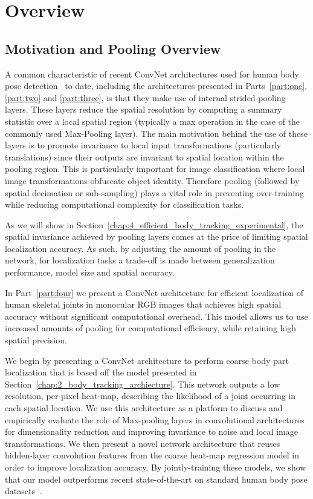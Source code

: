 \chapter{Overview\label{chap:4_efficient_body_tracking_overview}}

\section{Motivation and Pooling Overview}

A common characteristic of recent ConvNet architectures used for human body pose detection~\cite{tompsonnips2014, arjunaccv2014, deeppose, chennips2014} to date, including the architectures presented in Parts~\ref{part:one}, \ref{part:two} and \ref{part:three}, is that they make use of internal strided-pooling layers. These layers reduce the spatial resolution by computing a summary statistic over a local spatial region (typically a max operation in the case of the commonly used Max-Pooling layer). The main motivation behind the use of these layers is to promote invariance to local input transformations (particularly translations) since their outputs are invariant to spatial location within the pooling region. This is particularly important for image classification where local image transformations obfuscate object identity. Therefore pooling (followed by spatial decimation or sub-sampling) plays a vital role in preventing over-training while reducing computational complexity for classification tasks.

As we will show in Section~\ref{chap:4_efficient_body_tracking_experimental}, the spatial invariance achieved by pooling layers comes at the price of limiting spatial localization accuracy. As such, by adjusting the amount of pooling in the network, for localization tasks a trade-off is made between generalization performance, model size and spatial accuracy.

In Part~\ref{part:four} we present a ConvNet architecture for efficient localization of human skeletal joints in monocular RGB images that achieves high spatial accuracy without significant computational overhead. This model allows us to use increased amounts of pooling for computational efficiency, while retaining high spatial precision.

We begin by presenting a ConvNet architecture to perform coarse body part localization that is based off the model presented in Section~\ref{chap:2_body_tracking_archiecture}. This network outputs a low resolution, per-pixel heat-map, describing the likelihood of a joint occurring in each spatial location. We use this architecture as a platform to discuss and empirically evaluate the role of Max-pooling layers in convolutional architectures for dimensionality reduction and improving invariance to noise and local image transformations. We then present a novel network architecture that reuses hidden-layer convolution features from the coarse heat-map regression model in order to improve localization accuracy. By jointly-training these models, we show that our model outperforms recent state-of-the-art on standard human body pose datasets~\cite{andriluka14cvpr, modec}.

